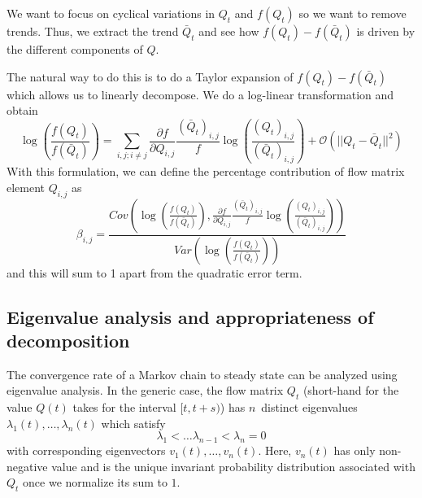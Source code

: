 We want to focus on cyclical variations in $Q_t$ and $f(Q_t)$ so we want to remove trends. Thus, we extract the trend $\bar{Q}_t$ and see how $f(Q_t)-f(\bar{Q}_t)$ is driven by the different components of $Q$. 

The natural way to do this is to do a Taylor expansion of $f(Q_t)-f(\bar{Q}_t)$ which allows us to linearly decompose. We do a log-linear transformation and obtain
\[
\log\left(\frac{f(Q_t)}{f(\bar{Q}_t)}\right) = \sum_{i,j; i\neq j} \frac{\partial f}{\partial Q_{i,j}}\frac{(\bar{Q}_t)_{i,j}}{f}\log\left(\frac{(Q_t)_{i,j}}{(\bar{Q}_t)_{i,j}}\right)+\mathcal{O}\left(||Q_t-\bar{Q}_t||^2\right)
\]
With this formulation, we can define the percentage contribution of flow matrix element $Q_{i,j}$ as 
\[
\beta_{i,j} = \frac{Cov\left(\log\left(\frac{f(Q_t)}{f(\bar{Q}_t)}\right), \frac{\partial f}{\partial Q_{i,j}}\frac{(\bar{Q}_t)_{i,j}}{f}\log\left(\frac{({Q}_t)_{i,j}}{(\bar{Q}_t)_{i,j}}\right)\right)}{Var\left(\log\left(\frac{f(Q_t)}{f(\bar{Q}_t)}\right)\right)}
\]
and this will sum to 1 apart from the quadratic error term.


\subsection{Eigenvalue analysis and appropriateness of decomposition}
The convergence rate of a Markov chain to steady state can be analyzed using eigenvalue analysis. In the generic case, the flow matrix $Q_t$ (short-hand for the value $Q(t)$ takes for the interval $[t,t+s)$) has $n$ distinct eigenvalues $\lambda_1(t),\dots,\lambda_n(t)$ which satisfy
\[
\lambda_1 < \dots \lambda_{n-1}<\lambda_n = 0
\]
with corresponding eigenvectors $v_1(t),\dots,v_n(t)$. Here, $v_n(t)$ has only non-negative value and is the unique invariant probability distribution associated with $Q_t$ once we normalize its sum to $1$.

